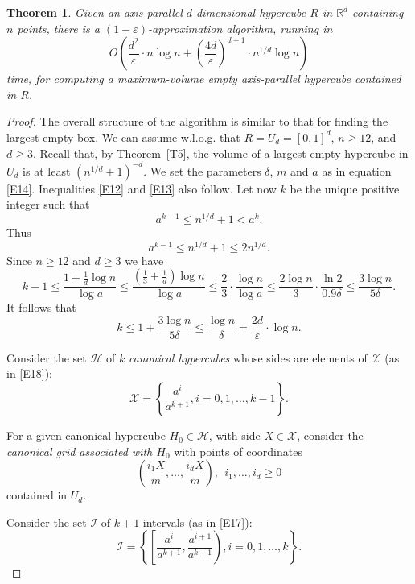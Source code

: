 \documentclass[11pt]{article}
\newtheorem{theorem}{Theorem}
\newcommand{\eps}{\varepsilon}
\newcommand{\RR}{\mathbb{R}}
\def\H{\mathcal H}
\def\I{\mathcal I}
\def\X{\mathcal X}
\begin{document}
\begin{theorem} \label{T6}
Given an axis-parallel $d$-dimensional hypercube $R$ in $\RR^d$ containing
$n$ points, there is a $(1-\eps)$-approximation algorithm, running in  
$$ O\left( \frac{d^2}{\eps} \cdot n \log{n} +
\left( \frac{4d}{\eps} \right)^{d+1} \cdot n^{1/d} \log{n}  \right)
$$
time, for computing a maximum-volume empty axis-parallel hypercube 
contained in $R$. 
\end{theorem}
\begin{proof} The overall structure of the algorithm is
similar to that for finding the largest empty box. 
We can assume w.l.o.g. that $R=U_d=[0,1]^d$, $n \geq 12$, and $d \geq 3$. 
Recall that, by Theorem~\ref{T5}, the volume of a largest empty
hypercube in $U_d$ is at least $(n^{1/d} + 1)^{-d}$.  
We set the parameters $\delta$, $m$ and $a$ as in equation \eqref{E14}. 
Inequalities \eqref{E12} and \eqref{E13} also follow.
Let now $k$ be the unique positive integer such that
\begin{equation} \label{E30}
a^{k-1} \leq n^{1/d} + 1 <a^k.
\end{equation} 
Thus 
$$ a^{k-1} \leq n^{1/d} + 1 \leq 2n^{1/d}. $$
Since $n \geq 12$ and $d \geq 3$ we have 
$$ k-1 \leq \frac{1+ \frac{1}{d} \log{n}}{\log a} \leq
\frac{(\frac{1}{3}+ \frac{1}{d}) \log{n}}{\log a} \leq
\frac{2}{3} \cdot \frac{\log{n}}{\log a} \leq 
\frac{2\log{n}}{3} \cdot \frac{\ln{2}}{0.9 \delta} \leq
\frac{3\log{n}}{5\delta}. $$
It follows that 
\begin{equation} \label{E27}
k \leq 1 + \frac{3\log{n}}{5\delta} \leq \frac{\log{n}}{\delta} =
\frac{2d}{\eps} \cdot \log{n}. 
\end{equation} 


Consider the set $\H$ of $k$ {\em canonical hypercubes} whose sides
are elements of $\X$ (as in \eqref{E18}):
\begin{equation} \label{E26}
\X=\left\{\frac{a^i}{a^{k+1}}, i=0,1,\ldots,k-1\right\}. 
\end{equation} 


For a given canonical hypercube $H_0 \in \H$, with side $X \in \X$,
consider the {\em canonical grid associated with $H_0$} 
with points of coordinates 
\begin{equation} \label{E19}
\left(\frac{i_1 X}{m}, \ldots, \frac{i_d X}{m}\right), \ \ 
i_1,\ldots, i_d \geq 0 
\end{equation} 
contained in $U_d$. 

Consider the set $\I$ of $k+1$ intervals (as in \eqref{E17}): 
\begin{equation} \label{E21}
\I=\left\{\left[\frac{a^i}{a^{k+1}}, \frac{a^{i+1}}{a^{k+1}}\right),
  i=0,1,\ldots,k\right\}. 
\end{equation} 



\end{proof}
\end{document}
